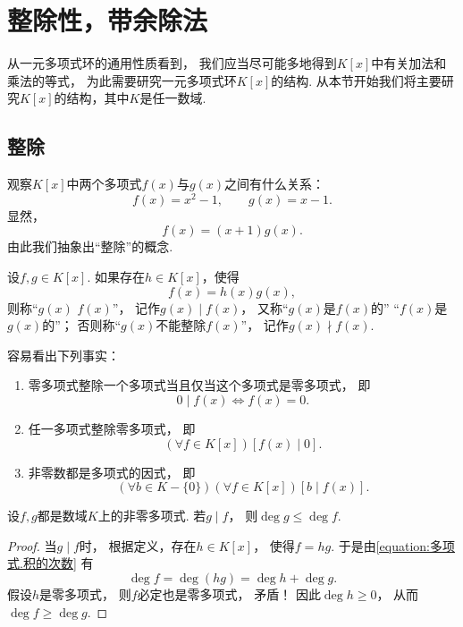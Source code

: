 \section{整除性，带余除法}
从一元多项式环的通用性质看到，
我们应当尽可能多地得到\(K[x]\)中有关加法和乘法的等式，
为此需要研究一元多项式环\(K[x]\)的结构.
从本节开始我们将主要研究\(K[x]\)的结构，其中\(K\)是任一数域.

\subsection{整除}
观察\(K[x]\)中两个多项式\(f(x)\)与\(g(x)\)之间有什么关系：\begin{equation*}
	f(x)=x^2-1, \qquad
	g(x)=x-1.
\end{equation*}
显然，\begin{equation*}
	f(x)=(x+1) g(x).
\end{equation*}
由此我们抽象出“整除”的概念.

\begin{definition}
设\(f,g \in K[x]\).
如果存在\(h \in K[x]\)，使得\begin{equation*}
	f(x) = h(x) g(x),
\end{equation*}
则称“\(g(x)\)  \(f(x)\)”，
记作\(g(x) \mid f(x)\)，
又称“\(g(x)\)是\(f(x)\)的”
“\(f(x)\)是\(g(x)\)的”；
否则称“\(g(x)\)不能整除\(f(x)\)”，
记作\(g(x) \nmid f(x)\).
\end{definition}

容易看出下列事实：
\begin{enumerate}
	\item 零多项式整除一个多项式当且仅当这个多项式是零多项式，
	即\begin{equation*}
		0 \mid f(x)
		\iff
		f(x) = 0.
	\end{equation*}
	\item 任一多项式整除零多项式，
	即\begin{equation*}
		(\forall f \in K[x])
		[f(x) \mid 0].
	\end{equation*}
	\item 非零数都是多项式的因式，
	即\begin{equation*}
		(\forall b \in K - \{0\})
		(\forall f \in K[x])
		[b \mid f(x)].
	\end{equation*}
\end{enumerate}

\begin{proposition}\label{theorem:多项式.整除的序}
设\(f,g\)都是数域\(K\)上的非零多项式.
若\(g \mid f\)，
则\(\deg g \leq \deg f\).
\begin{proof}
当\(g \mid f\)时，
根据定义，存在\(h \in K[x]\)，
使得\(f = h g\).
于是由\cref{equation:多项式.积的次数} 有\begin{equation*}
	\deg f
	= \deg(hg)
	= \deg h + \deg g.
\end{equation*}
假设\(h\)是零多项式，
则\(f\)必定也是零多项式，
矛盾！
因此\(\deg h\geq0\)，
从而\(\deg f\geq\deg g\).
\end{proof}
\end{proposition}

